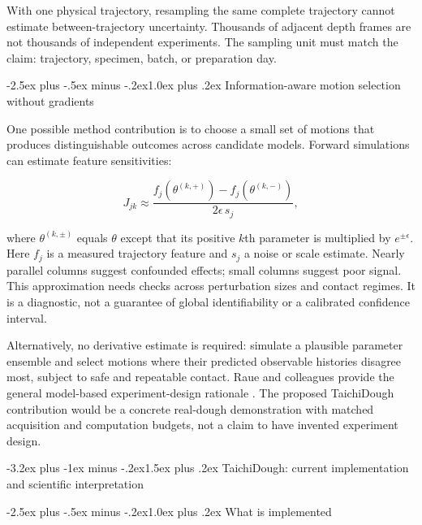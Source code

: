 \documentclass[
  11pt,
]{article}
\makeatletter
\renewcommand\section{\needspace{7\baselineskip}\@startsection{section}{1}{\z@}%
  {-3.2ex plus -1ex minus -.2ex}{1.5ex plus .2ex}%
  {\normalfont\sffamily\Large\bfseries\color{accent}}}
\renewcommand\subsection{\needspace{5\baselineskip}\@startsection{subsection}{2}{\z@}%
  {-2.5ex plus -.5ex minus -.2ex}{1.0ex plus .2ex}%
  {\normalfont\sffamily\large\bfseries\color{accent}}}
\makeatother
\begin{document}
With one physical trajectory, resampling the same complete trajectory
cannot estimate between-trajectory uncertainty. Thousands of adjacent
depth frames are not thousands of independent experiments. The sampling
unit must match the claim: trajectory, specimen, batch, or preparation
day.

\subsection{Information-aware motion selection without
gradients}\label{information-aware-motion-selection-without-gradients}

One possible method contribution is to choose a small set of motions
that produces distinguishable outcomes across candidate models. Forward
simulations can estimate feature sensitivities:

\[
J_{jk}\approx\frac{f_j(\theta^{(k,+)})-f_j(\theta^{(k,-)})}
{2\epsilon\,s_j},
\]

where \(\theta^{(k,\pm)}\) equals \(\theta\) except that its positive
\(k\)th parameter is multiplied by \(e^{\pm\epsilon}\). Here \(f_j\) is
a measured trajectory feature and \(s_j\) a noise or scale estimate.
Nearly parallel columns suggest confounded effects; small columns
suggest poor signal. This approximation needs checks across perturbation
sizes and contact regimes. It is a diagnostic, not a guarantee of global
identifiability or a calibrated confidence interval.

Alternatively, no derivative estimate is required: simulate a plausible
parameter ensemble and select motions where their predicted observable
histories disagree most, subject to safe and repeatable contact. Raue
and colleagues provide the general model-based experiment-design
rationale . The proposed TaichiDough
contribution would be a concrete real-dough demonstration with matched
acquisition and computation budgets, not a claim to have invented
experiment design.

\section{TaichiDough: current implementation and scientific
interpretation}\label{taichidough-current-implementation-and-scientific-interpretation}

\subsection{What is implemented}\label{what-is-implemented}
\end{document}

